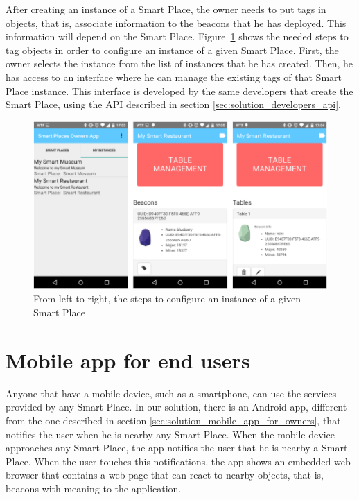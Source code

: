 After creating an instance of a Smart Place, the owner needs to put tags in objects, that is, associate information to the beacons that he has deployed.
This information will depend on the Smart Place.
Figure~\ref{fig:screenshot_ownersapp_configure} shows the needed steps to tag objects in order to configure an instance of a given Smart Place.
First, the owner selects the instance from the list of instances that he has created.
Then, he has access to an interface where he can manage the existing tags of that Smart Place instance.
This interface is developed by the same developers that create the Smart Place, using the \gls{API} described in section \ref{sec:solution_developers_api}.

\begin{figure}[!ht]
  \centering
    \includegraphics[width=1\textwidth, keepaspectratio]{images/screenshots/ownersapp_configure}
    \caption{From left to right, the steps to configure an instance of a given Smart Place}
    \label{fig:screenshot_ownersapp_configure}
\end{figure}

\section{Mobile app for end users}
\label{sec:solution_mobile_app_for_end_users}
Anyone that have a mobile device, such as a smartphone, can use the services provided by any Smart Place.
In our solution, there is an Android app, different from the one described in section \ref{sec:solution_mobile_app_for_owners}, that notifies the user when he is nearby any Smart Place.
When the mobile device approaches any Smart Place, the app notifies the user that he is nearby a Smart Place.
When the user touches this notifications, the app shows an embedded web browser that contains a web page that can react to nearby objects, that is, beacons with meaning to the application.

